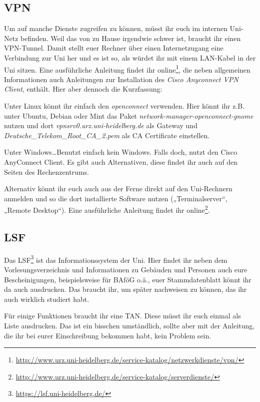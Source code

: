 \subsection*{VPN}
Um auf manche Dienste zugreifen zu können, müsst ihr euch im internen Uni-Netz befinden. Weil das von zu Hause irgendwie schwer ist, braucht ihr einen VPN-Tunnel. Damit stellt euer Rechner über einen Internetzugang eine Verbindung zur Uni her und es ist so, als würdet ihr mit einem LAN-Kabel in der Uni sitzen. Eine ausführliche Anleitung findet ihr online\footnote{\url{http://www.urz.uni-heidelberg.de/service-katalog/netzwerkdienste/vpn/}}, die neben allgemeinen Informationen auch Anleitungen zur Installation des \emph{Cisco Anyconnect VPN Client}, enthält. Hier aber dennoch die Kurzfassung:

Unter Linux könnt ihr einfach den \emph{openconnect} verwenden. Hier könnt ihr z.B. unter Ubuntu, Debian oder Mint das Paket \emph{network-manager-openconnect-gnome} nutzen und dort \emph{vpnsrv0.urz.uni-heidelberg.de} als Gateway und \emph{Deutsche\_Telekom\_Root\_CA\_2.pem} als CA Certificate einstellen.

Unter Windows\ldots Benutzt einfach kein Windows. Falls doch, nutzt den Cisco AnyConnect Client. Es gibt auch Alternativen, diese findet ihr auch auf den Seiten des Rechenzentrums.

Alternativ könnt ihr euch auch aus der Ferne direkt auf den Uni-Rechnern anmelden und so die dort installierte Software nutzen („Terminalserver“, „Remote Desktop“). Eine ausführliche Anleitung findet ihr online\footnote{\url{http://www.urz.uni-heidelberg.de/service-katalog/serverdienste/}}.

\subsection*{LSF}
Das LSF\footnote{\url{https://lsf.uni-heidelberg.de/}} ist das Informationssystem der Uni. Hier findet ihr neben dem Vorlesungsverzeichnis und Informationen zu Gebäuden und Personen auch eure Bescheinigungen, beispielsweise für BAföG o.ä., euer Stammdatenblatt könnt ihr da auch ausdrucken. Das braucht ihr, um später nachweisen zu können, das ihr auch wirklich studiert habt.

Für einige Funktionen braucht ihr eine TAN. Diese müsst ihr euch einmal als Liste ausdrucken. Das ist ein bisschen umständlich, sollte aber mit der Anleitung, die ihr bei eurer Einschreibung bekommen habt, kein Problem sein.

